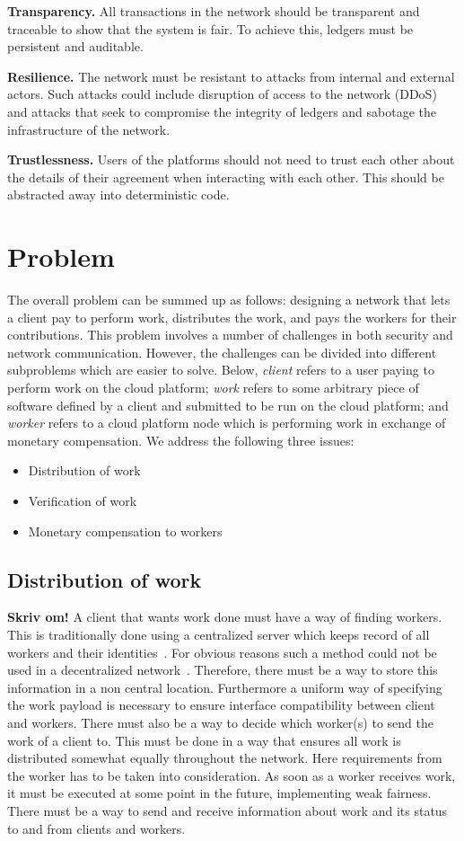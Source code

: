 \textbf{Transparency.} All transactions in the network should be transparent and traceable to show that the system is fair. To achieve this, ledgers must be persistent and auditable.

\textbf{Resilience.} The network must be resistant to attacks from internal and external actors. Such attacks could include disruption of access to the network (DDoS) and attacks that seek to compromise the integrity of ledgers and sabotage the infrastructure of the network.

\textbf{Trustlessness.} Users of the platforms should not need to trust each other about the details of their agreement when interacting with each other. This should be abstracted away into deterministic code.

\section{Problem}
The overall problem can be summed up as follows: designing a network that lets a client pay to perform work, distributes the work, and pays the workers for their contributions. This problem involves a number of challenges in both security and network communication. However, the challenges can be divided into different subproblems which are easier to solve. Below, \emph{client} refers to a user paying to perform work on the cloud platform; \emph{work} refers to some arbitrary piece of software defined by a client and submitted to be run on the cloud platform; and \emph{worker} refers to a cloud platform node which is performing work in exchange of monetary compensation.
We address the following three issues:
\begin{itemize}
\item Distribution of work
\item Verification of work
\item Monetary compensation to workers
\end{itemize}

\subsection{Distribution of work}
\textbf{Skriv om!}
A client that wants work done must have a way of finding workers. This is traditionally done using a centralized server which keeps record of all workers and their identities~\cite{anderson:2005}\cite{sarmenta:2002}. For obvious reasons such a method could not be used in a decentralized network~\cite{baran}. Therefore, there must be a way to store this information in a non central location. Furthermore a uniform way of specifying the work payload is necessary to ensure interface compatibility between client and workers. There must also be a way to decide which worker(s) to send the work of a client to. This must be done in a way that ensures all work is distributed somewhat equally throughout the network. Here requirements from the worker has to be taken into consideration. As soon as a worker receives work, it must be executed at some point in the future, implementing weak fairness. There must be a way to send and receive information about work and its status to and from clients and workers.

